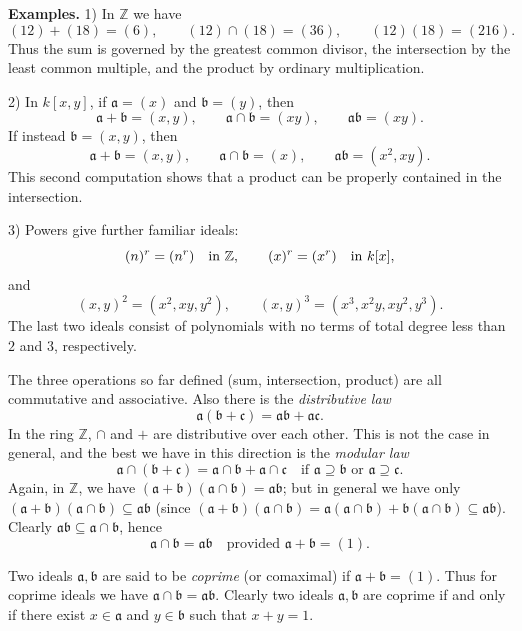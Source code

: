 \textline
\noindent\textbf{Examples.} 1) In $\mathbb Z$ we have
\[
(12)+(18)=(6),\qquad (12)\cap(18)=(36),\qquad (12)(18)=(216).
\]
Thus the sum is governed by the greatest common divisor, the intersection by
the least common multiple, and the product by ordinary multiplication.

2) In $k[x,y]$, if $\mathfrak a=(x)$ and $\mathfrak b=(y)$, then
\[
\mathfrak a+\mathfrak b=(x,y),\qquad
\mathfrak a\cap\mathfrak b=(xy),\qquad
\mathfrak a\mathfrak b=(xy).
\]
If instead $\mathfrak b=(x,y)$, then
\[
\mathfrak a+\mathfrak b=(x,y),\qquad
\mathfrak a\cap\mathfrak b=(x),\qquad
\mathfrak a\mathfrak b=(x^2,xy).
\]
This second computation shows that a product can be properly contained in the
intersection.

3) Powers give further familiar ideals:
\[
(n)^r=(n^r)\quad\hbox{in }\mathbb Z,
\qquad (x)^r=(x^r)\quad\hbox{in }k[x],
\]
and
\[
(x,y)^2=(x^2,xy,y^2),\qquad
(x,y)^3=(x^3,x^2y,xy^2,y^3).
\]
The last two ideals consist of polynomials with no terms of total degree less
than $2$ and $3$, respectively.
\textline

The three operations so far defined (sum, intersection, product) are all
commutative and associative.  Also there is the \emph{distributive law}
\[
\mathfrak a(\mathfrak b+\mathfrak c)=\mathfrak a\mathfrak b+\mathfrak a\mathfrak c.
\]
In the ring $\mathbb Z$, $\cap$ and $+$ are distributive over each other.  This is not the case
in general, and the best we have in this direction is the \emph{modular law}
\[
\mathfrak a\cap(\mathfrak b+\mathfrak c)=\mathfrak a\cap\mathfrak b+\mathfrak a\cap\mathfrak c\quad\text{if }\mathfrak a\supseteq\mathfrak b\text{ or }\mathfrak a\supseteq\mathfrak c.
\]
Again, in $\mathbb Z$, we have $(\mathfrak a+\mathfrak b)(\mathfrak a\cap\mathfrak b)=\mathfrak a\mathfrak b$; but in general we have only
$(\mathfrak a+\mathfrak b)(\mathfrak a\cap\mathfrak b)\subseteq\mathfrak a\mathfrak b$ (since $(\mathfrak a+\mathfrak b)(\mathfrak a\cap\mathfrak b)=\mathfrak a(\mathfrak a\cap\mathfrak b)+\mathfrak b(\mathfrak a\cap\mathfrak b)\subseteq\mathfrak a\mathfrak b$).
Clearly $\mathfrak a\mathfrak b\subseteq\mathfrak a\cap\mathfrak b$, hence
\[
\mathfrak a\cap\mathfrak b=\mathfrak a\mathfrak b\quad\text{provided }\mathfrak a+\mathfrak b=(1).
\]

Two ideals $\mathfrak a,\mathfrak b$ are said to be \emph{coprime} (or comaximal) if $\mathfrak a+\mathfrak b=(1)$.  Thus
for coprime ideals we have $\mathfrak a\cap\mathfrak b=\mathfrak a\mathfrak b$.  Clearly two ideals $\mathfrak a,\mathfrak b$ are coprime if
and only if there exist $x\in\mathfrak a$ and $y\in\mathfrak b$ such that $x+y=1$.

